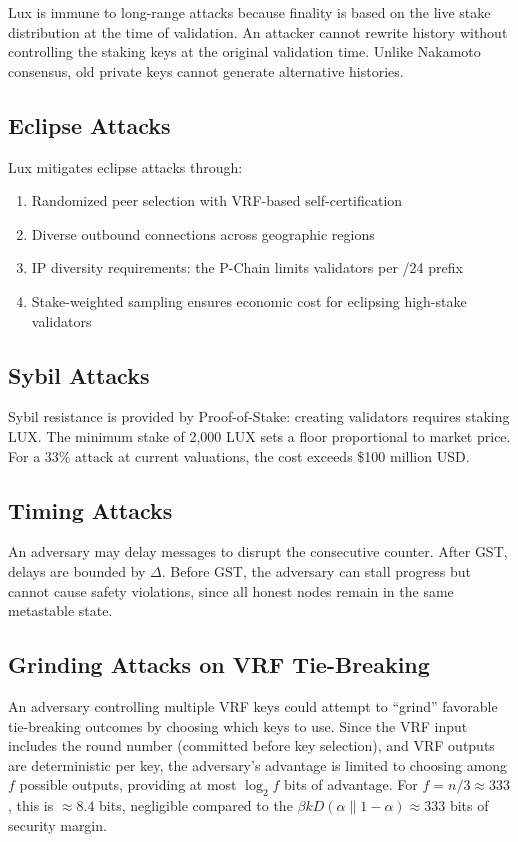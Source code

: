 \documentclass[11pt,a4paper]{article}
\begin{document}
Lux is immune to long-range attacks because finality is based on the live stake distribution
at the time of validation. An attacker cannot rewrite history without controlling the staking
keys at the original validation time. Unlike Nakamoto consensus, old private keys cannot
generate alternative histories.

\subsection{Eclipse Attacks}

Lux mitigates eclipse attacks through:
\begin{enumerate}[nosep]
\item Randomized peer selection with VRF-based self-certification
\item Diverse outbound connections across geographic regions
\item IP diversity requirements: the P-Chain limits validators per /24 prefix
\item Stake-weighted sampling ensures economic cost for eclipsing high-stake validators
\end{enumerate}

\subsection{Sybil Attacks}

Sybil resistance is provided by Proof-of-Stake: creating validators requires staking LUX.
The minimum stake of 2,000 LUX sets a floor proportional to market price. For a 33\%
attack at current valuations, the cost exceeds \$100 million USD.

\subsection{Timing Attacks}

An adversary may delay messages to disrupt the consecutive counter. After GST, delays are
bounded by $\Delta$. Before GST, the adversary can stall progress but cannot cause safety
violations, since all honest nodes remain in the same metastable state.

\subsection{Grinding Attacks on VRF Tie-Breaking}

An adversary controlling multiple VRF keys could attempt to ``grind'' favorable tie-breaking
outcomes by choosing which keys to use. Since the VRF input includes the round number
(committed before key selection), and VRF outputs are deterministic per key, the adversary's
advantage is limited to choosing among $f$ possible outputs, providing at most $\log_2 f$
bits of advantage. For $f = n/3 \approx 333$, this is $\approx 8.4$ bits, negligible compared
to the $\beta k D(\alpha \| 1-\alpha) \approx 333$ bits of security margin.
\end{document}
